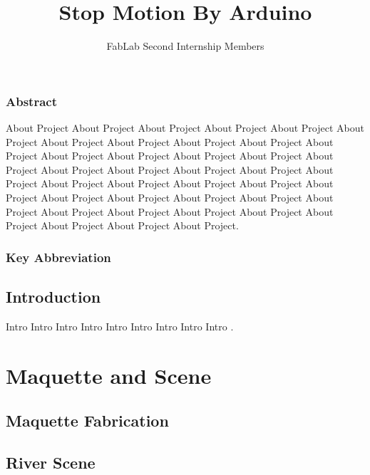 \documentclass[]{report}
\title{Stop Motion By Arduino}
\author{FabLab Second Internship Members}
\begin{document}
\maketitle

\section*{Abstract}
	About Project About Project About Project About Project About Project About Project About Project About Project About Project About Project About Project About Project About Project About Project About Project About Project About Project About Project About Project About Project About Project About Project About Project About Project About Project About Project About Project About Project About Project About Project About Project About Project About Project About Project About Project About Project About Project About Project About Project.


\newpage

\section*{Key Abbreviation}


\tableofcontents

\listoffigures
{}

\listoftables
{}

\newpage

\chapter{Introduction}
	Intro Intro Intro Intro Intro Intro Intro Intro Intro \cite{DUMMY:1}.
\part{Maquette and Scene}

	\chapter{Maquette Fabrication}
	
	\chapter{River Scene}
	
\end{document}
